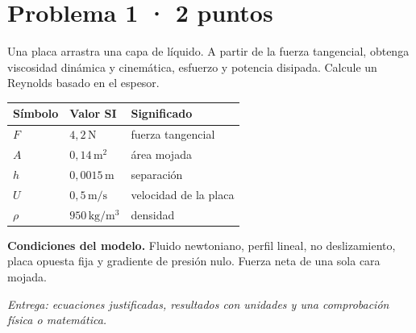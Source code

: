 \par\medskip\noindent\begin{minipage}{\linewidth}

\section{Problema 1 · 2 puntos}

Una placa arrastra una capa de líquido. A partir de la fuerza tangencial, obtenga viscosidad dinámica y cinemática, esfuerzo y potencia disipada. Calcule un Reynolds basado en el espesor.

\begin{tabular}{@{}p{.15\linewidth}p{.23\linewidth}p{.54\linewidth}@{}}
\toprule Símbolo & Valor SI & Significado\\\midrule
$F$ & $4{,}2\,\mathrm{N}$ & fuerza tangencial\\
$A$ & $0{,}14\,\mathrm{m^2}$ & área mojada\\
$h$ & $0{,}0015\,\mathrm{m}$ & separación\\
$U$ & $0{,}5\,\mathrm{m/s}$ & velocidad de la placa\\
$\rho$ & $950\,\mathrm{kg/m^3}$ & densidad\\
\bottomrule\end{tabular}

\par\medskip\textbf{Condiciones del modelo.} Fluido newtoniano, perfil lineal, no deslizamiento, placa opuesta fija y gradiente de presión nulo. Fuerza neta de una sola cara mojada.

\par\textit{Entrega: ecuaciones justificadas, resultados con unidades y una comprobación física o matemática.}

\end{minipage}\par\medskip

